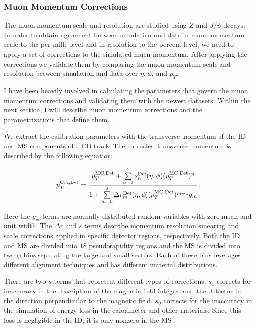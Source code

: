 \subsubsection{Muon Momentum Corrections} 
\par \hspace{20pt} The muon momentum scale and resolution are studied using $Z$ and $J/\psi$ decays. In order to obtain agreement between simulation and data in muon momentum scale to the per mille level and in resolution to the percent level, we need to apply a set of corrections to the simulated muon momentum. After applying the corrections we validate them by comparing the muon momentum scale and resolution between simulation and data over $\eta$, $\phi$, and $p_T$.

\par \hspace{20pt} I have been heavily involved in calculating the parameters that govern the muon momentum corrections and validating them with the newest datasets. Within the next section, I will describe muon momentum corrections and the parametrizations that define them.

\par \hspace{20pt} We extract the calibration parameters with the transverse momentum of the ID and MS components of a CB track.  The corrected transverse momentum is described by the following equation: 

\begin{align*}
	\centering 
    p_T^{\textrm{Cor,Det}} = \frac{p_T^{\textrm{MC,Det}}+\sum\limits_{n=0}^1s_n^{\textrm{Det}}(\eta,\phi)(p_T^{\textrm{MC,Det}})^n}{1+\sum\limits_{m=0}^2\Delta r_m^{\textrm{Det}}(\eta,\phi)(p_T^{\textrm{MC,Det}})^{m-1}g_m} .
\end{align*}
\par \hspace{20pt} Here the $g_m$ terms are normally distributed random variables with zero mean and unit width. The $\Delta r $ and $s$ terms describe momentum resolution smearing and scale corrections applied in specific detector regions, respectively. Both the ID and MS are divided into $18$ pseudorapidity regions and the MS is divided into two $\phi$ bins separating the large and small sectors. Each of these bins leverages different alignment techniques and has different material distributions. 

\par \hspace{20pt} There are two $s$ terms that represent different types of corrections. $s_1$ corrects for inaccuracy in the description of the magnetic field integral and the detector in the direction perpendicular to the magnetic field. $s_0$ corrects for the inaccuracy in the simulation of energy loss in the calorimeter and other materials. Since this loss is negligible in the ID, it is only nonzero in the MS \cite{MCPpaper}.

